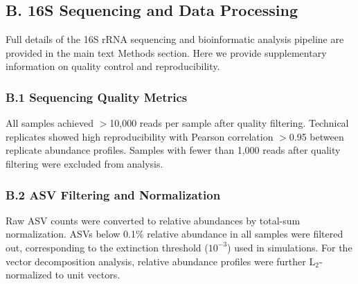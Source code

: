 \subsection*{B. 16S Sequencing and Data Processing}
\label{sec:suppl:sequencing}

Full details of the 16S rRNA sequencing and bioinformatic analysis pipeline are provided in the main text Methods section. Here we provide supplementary information on quality control and reproducibility.

\subsubsection*{B.1 Sequencing Quality Metrics}

All samples achieved $>$10,000 reads per sample after quality filtering. Technical replicates showed high reproducibility with Pearson correlation $>$0.95 between replicate abundance profiles. Samples with fewer than 1,000 reads after quality filtering were excluded from analysis.

\subsubsection*{B.2 ASV Filtering and Normalization}

Raw ASV counts were converted to relative abundances by total-sum normalization. ASVs below 0.1\% relative abundance in all samples were filtered out, corresponding to the extinction threshold ($10^{-3}$) used in simulations. For the vector decomposition analysis, relative abundance profiles were further L$_2$-normalized to unit vectors.


